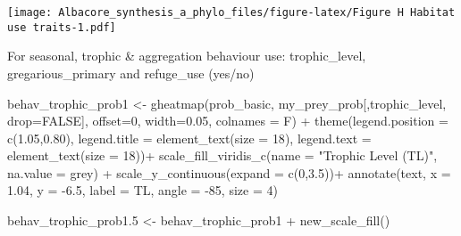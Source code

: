 \documentclass[
]{article}
\newenvironment{Shaded}{\begin{snugshade}}{\end{snugshade}}
\newcommand{\AttributeTok}[1]{\textcolor[rgb]{0.77,0.63,0.00}{#1}}
\newcommand{\ConstantTok}[1]{\textcolor[rgb]{0.00,0.00,0.00}{#1}}
\newcommand{\DecValTok}[1]{\textcolor[rgb]{0.00,0.00,0.81}{#1}}
\newcommand{\FloatTok}[1]{\textcolor[rgb]{0.00,0.00,0.81}{#1}}
\newcommand{\FunctionTok}[1]{\textcolor[rgb]{0.00,0.00,0.00}{#1}}
\newcommand{\NormalTok}[1]{#1}
\newcommand{\OtherTok}[1]{\textcolor[rgb]{0.56,0.35,0.01}{#1}}
\newcommand{\SpecialCharTok}[1]{\textcolor[rgb]{0.00,0.00,0.00}{#1}}
\newcommand{\StringTok}[1]{\textcolor[rgb]{0.31,0.60,0.02}{#1}}
\begin{document}
\texttt{[image: Albacore\_synthesis\_a\_phylo\_files/figure-latex/Figure H Habitat use traits-1.pdf]}

For seasonal, trophic \& aggregation behaviour use: trophic\_level,
gregarious\_primary and refuge\_use (yes/no)

\begin{Shaded}
\begin{Highlighting}[]
\NormalTok{behav\_trophic\_prob1 }\OtherTok{\textless{}{-}} \FunctionTok{gheatmap}\NormalTok{(prob\_basic, my\_prey\_prob[,}\StringTok{\textquotesingle{}trophic\_level\textquotesingle{}}\NormalTok{, }\AttributeTok{drop=}\ConstantTok{FALSE}\NormalTok{], }
                                \AttributeTok{offset=}\DecValTok{0}\NormalTok{, }\AttributeTok{width=}\FloatTok{0.05}\NormalTok{, }\AttributeTok{colnames =}\NormalTok{ F) }\SpecialCharTok{+}
  \FunctionTok{theme}\NormalTok{(}\AttributeTok{legend.position =} \FunctionTok{c}\NormalTok{(}\FloatTok{1.05}\NormalTok{,}\FloatTok{0.80}\NormalTok{),}
        \AttributeTok{legend.title =} \FunctionTok{element\_text}\NormalTok{(}\AttributeTok{size =} \DecValTok{18}\NormalTok{), }
        \AttributeTok{legend.text =} \FunctionTok{element\_text}\NormalTok{(}\AttributeTok{size =} \DecValTok{18}\NormalTok{))}\SpecialCharTok{+}
  \FunctionTok{scale\_fill\_viridis\_c}\NormalTok{(}\AttributeTok{name =} \StringTok{"Trophic Level (TL)"}\NormalTok{, }\AttributeTok{na.value =} \StringTok{\textquotesingle{}grey\textquotesingle{}}\NormalTok{) }\SpecialCharTok{+}
  \FunctionTok{scale\_y\_continuous}\NormalTok{(}\AttributeTok{expand =} \FunctionTok{c}\NormalTok{(}\DecValTok{0}\NormalTok{,}\FloatTok{3.5}\NormalTok{))}\SpecialCharTok{+}
  \FunctionTok{annotate}\NormalTok{(}\StringTok{\textquotesingle{}text\textquotesingle{}}\NormalTok{, }\AttributeTok{x =} \FloatTok{1.04}\NormalTok{, }\AttributeTok{y =} \SpecialCharTok{{-}}\FloatTok{6.5}\NormalTok{, }\AttributeTok{label =} \StringTok{\textquotesingle{}TL\textquotesingle{}}\NormalTok{, }\AttributeTok{angle =} \SpecialCharTok{{-}}\DecValTok{85}\NormalTok{, }\AttributeTok{size =} \DecValTok{4}\NormalTok{)}

\NormalTok{behav\_trophic\_prob1}\FloatTok{.5} \OtherTok{\textless{}{-}}\NormalTok{ behav\_trophic\_prob1 }\SpecialCharTok{+} \FunctionTok{new\_scale\_fill}\NormalTok{()}


\end{Highlighting}
\end{Shaded}
\end{document}
